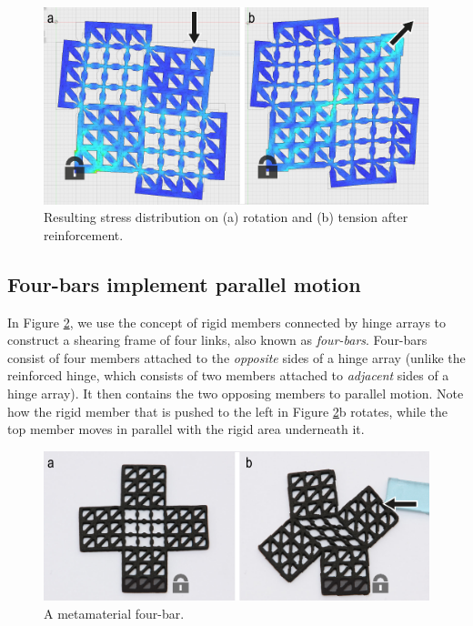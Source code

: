 \begin{figure} [h]
    \includegraphics[width=\textwidth]{chapters/metamaterial-mechanisms-FIG/8-simulation-tear-and-rotate.pdf}
    \caption[Short figure name.]{Resulting stress distribution on (a) rotation and (b) tension after reinforcement.
    \label{fig:8-simulation-tear-and-rotate}}
\end{figure}


\subsection{Four-bars implement parallel motion}

In Figure \ref{fig:9-metamaterial-four-bar}, we use the concept of rigid members connected by hinge arrays to construct a shearing frame of four links, also known as \textit{four-bars}. Four-bars consist of four members attached to the \textit{opposite} sides of a hinge array (unlike the reinforced hinge, which consists of two members attached to \textit{adjacent} sides of a hinge array). It then contains the two opposing members to parallel motion. Note how the rigid member that is pushed to the left in Figure \ref{fig:9-metamaterial-four-bar}b rotates, while the top member moves in parallel with the rigid area underneath it.

\begin{figure} [h]
    \includegraphics[width=\textwidth]{chapters/metamaterial-mechanisms-FIG/9-metamaterial-four-bar.pdf}
    \caption[Short figure name.]{A metamaterial four-bar. 
    \label{fig:9-metamaterial-four-bar}}
\end{figure}

